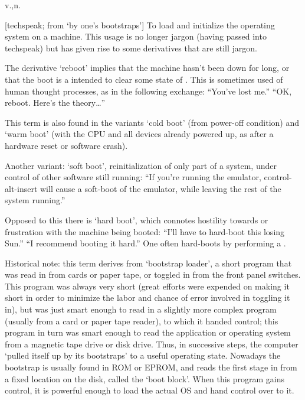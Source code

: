 v.,n.

[techspeak; from `by one's bootstraps'] To load and initialize the operating
system on a machine. This usage is no longer jargon (having passed into
techspeak) but has given rise to some derivatives that are still jargon.

The derivative `reboot' implies that the machine hasn't been down for long, or
that the boot is a  intended to clear some state of
. This is sometimes used of human thought processes, as in
the following exchange: ``You've lost me.'' ``OK, reboot. Here's the
theory\dots''

This term is also found in the variants `cold boot' (from power-off condition)
and `warm boot' (with the CPU and all devices already powered up, as after a
hardware reset or software crash).

Another variant: `soft boot', reinitialization of only part of a system, under
control of other software still running: ``If you're running the
 emulator, control-alt-insert will cause a soft-boot of the
emulator, while leaving the rest of the system running.''

Opposed to this there is `hard boot', which connotes hostility towards or
frustration with the machine being booted: ``I'll have to hard-boot this losing
Sun.'' ``I recommend booting it hard.'' One often hard-boots by performing a
.

Historical note: this term derives from `bootstrap loader', a short program that
was read in from cards or paper tape, or toggled in from the front panel
switches. This program was always very short (great efforts were expended on
making it short in order to minimize the labor and chance of error involved in
toggling it in), but was just smart enough to read in a slightly more complex
program (usually from a card or paper tape reader), to which it handed control;
this program in turn was smart enough to read the application or operating
system from a magnetic tape drive or disk drive. Thus, in successive steps, the
computer `pulled itself up by its bootstraps' to a useful operating state.
Nowadays the bootstrap is usually found in ROM or EPROM, and reads the first
stage in from a fixed location on the disk, called the `boot block'. When this
program gains control, it is powerful enough to load the actual OS and hand
control over to it.

